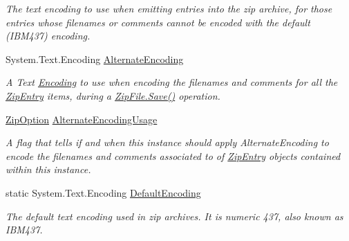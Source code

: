 \begin{DoxyCompactItemize}
\begin{DoxyCompactList}\small\item\em The text encoding to use when emitting entries into the zip archive, for those entries whose filenames or comments cannot be encoded with the default (I\+B\+M437) encoding. \end{DoxyCompactList}\item 
System.\+Text.\+Encoding \mbox{\hyperlink{class_super_tiled2_unity_1_1_ionic_1_1_zip_1_1_zip_output_stream_ab7aa76520f42cd062b9e890817f4c373}{Alternate\+Encoding}}
\begin{DoxyCompactList}\small\item\em A Text \mbox{\hyperlink{namespace_super_tiled2_unity_1_1_ionic_1_1_encoding}{Encoding}} to use when encoding the filenames and comments for all the \mbox{\hyperlink{class_super_tiled2_unity_1_1_ionic_1_1_zip_1_1_zip_entry}{Zip\+Entry}} items, during a \mbox{\hyperlink{class_super_tiled2_unity_1_1_ionic_1_1_zip_1_1_zip_file_aff8f1b3d07b66481e2629b04017a056f}{Zip\+File.\+Save()}} operation. \end{DoxyCompactList}\item 
\mbox{\hyperlink{namespace_super_tiled2_unity_1_1_ionic_1_1_zip_a25d431031427c142eba970006eee630c}{Zip\+Option}} \mbox{\hyperlink{class_super_tiled2_unity_1_1_ionic_1_1_zip_1_1_zip_output_stream_a68fe3cccef62a4745c6aacb71a05a744}{Alternate\+Encoding\+Usage}}
\begin{DoxyCompactList}\small\item\em A flag that tells if and when this instance should apply Alternate\+Encoding to encode the filenames and comments associated to of \mbox{\hyperlink{class_super_tiled2_unity_1_1_ionic_1_1_zip_1_1_zip_entry}{Zip\+Entry}} objects contained within this instance. \end{DoxyCompactList}\item 
static System.\+Text.\+Encoding \mbox{\hyperlink{class_super_tiled2_unity_1_1_ionic_1_1_zip_1_1_zip_output_stream_a855d0c7107aa6a1176c06041e8695ce7}{Default\+Encoding}}
\begin{DoxyCompactList}\small\item\em The default text encoding used in zip archives. It is numeric 437, also known as I\+B\+M437. \end{DoxyCompactList}\item 

\end{DoxyCompactItemize}
